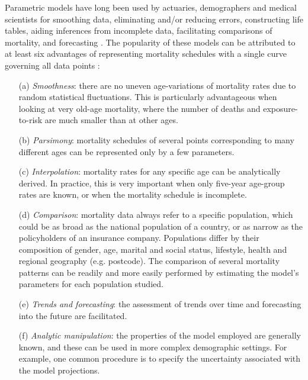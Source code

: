 \documentclass[Thesis]{subfiles}
\begin{document}
Parametric models have long been used by actuaries, demographers and medical scientists for smoothing data, eliminating and/or reducing errors, constructing life tables, aiding inferences from incomplete data, facilitating comparisons of mortality, and forecasting \citep{keyfitz1982choice}. The popularity of these models can be attributed to at least six advantages of representing mortality schedules with a single curve governing all data points \citep{congdon1993statistical}: 
\begin{enumerate}
	\item[(a)] \textit{Smoothness}: there are no uneven age-variations of mortality rates due to random statistical fluctuations. This is particularly advantageous when looking at very old-age mortality, where the number of deaths and exposure-to-risk are much smaller than at other ages.
	\item[(b)] \textit{Parsimony}: mortality schedules of several points corresponding to many different ages can be represented only by a few parameters. 
	\item[(c)] \textit{Interpolation}: mortality rates for any specific age can be analytically derived. In practice, this is very important when only five-year age-group rates are known, or when the mortality schedule is incomplete.
	\item[(d)] \textit{Comparison}: mortality data always refer to a specific population, which could be as broad as the national population of a country, or as narrow as the policyholders of an insurance company. Populations differ by their composition of gender, age, marital and social status, lifestyle, health and regional geography (e.g. postcode). The comparison of several mortality patterns can be readily and more easily performed by estimating the model's parameters for each population studied.
	\item[(e)] \textit{Trends and forecasting}: the assessment of trends over time and forecasting into the future are facilitated.
	\item[(f)] \textit{Analytic manipulation}: the properties of the model employed are generally known, and these can be used in more complex demographic settings. For example, one common procedure is to specify the uncertainty associated with the model projections. 
\end{enumerate}
\end{document}

